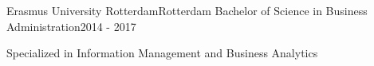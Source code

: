 \resumeSubheading
  {Erasmus University Rotterdam}{Rotterdam}
  {Bachelor of Science in Business Administration}{2014 - 2017}
  \vspace{\experienceItemSpacing}
  \resumeItemListStart
\item Specialized in Information Management and Business Analytics
  \resumeItemListEnd
